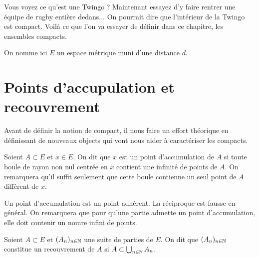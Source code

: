 
\minitoc  %

Vous voyez ce qu'est une Twingo ? Maintenant essayez d'y faire rentrer une équipe de rugby entière dedans...
On pourrait dire que l'intérieur de la Twingo est compact. Voilà ce que l'on va essayer de définir dans ce chapitre, les ensembles compacts. 

\vspace{0.3cm}

On nomme ici $E$ un espace métrique muni d'une distance $d$. 


\section{Points d'accupulation et recouvrement}

Avant de définir la notion de compact, il nous faire un effort théorique en définissant de nouveaux objects
qui vont nous aider à caractériser les compacts. 

\begin{definition}
    Soient $A \subset E$ et $x \in E$. On dit que $x$ est un point d'accumulation de $A$ si toute boule de rayon non nul 
    centrée en $x$ contient une infinité de points de $A$. On remarquera qu'il suffit seulement que cette boule contienne 
    un seul point de $A$ différent de $x$. 
\end{definition}

\begin{remark}
    Un point d'accumulation est un point adhérent. La réciproque est fausse en général. 
    On remarquera que pour qu'une partie admette un point d'accumulation, elle doit contenir un nomre infini de points. 
\end{remark}

\begin{definition}[Recouvrement]
    Soient $A \subset E$ et $(A_n)_{n \in \mathbb{N}}$ une suite de parties de $E$. On dit que $(A_n)_{n \in \mathbb{N}}$ constitue 
    un recouvrement de $A$ si $ A \subset \bigcup_{n \in \mathbb{N}} A_n $. 
\end{definition}

